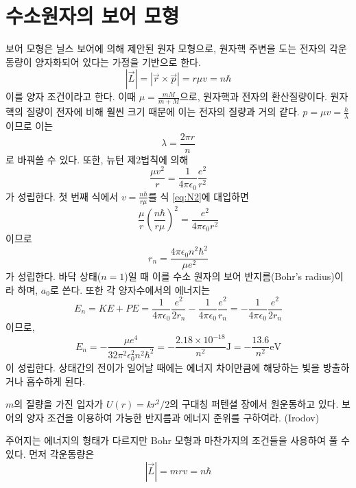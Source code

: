 \section{수소원자의 보어 모형}
보어 모형은 닐스 보어에 의해 제안된 원자 모형으로, 원자핵 주변을 도는 전자의 각운동량이 양자화되어 있다는 가정을 기반으로 한다. 
\begin{equation}
|\vec{L}|=|\vec{r}\times \vec{p}|=r\mu v=n\hbar
\end{equation}
이를 양자 조건이라고 한다. 이때 $\mu=\frac{mM}{m+M}$으로, 원자핵과 전자의 환산질량이다. 원자핵의 질량이 전자에 비해 훨씬 크기 때문에 이는 전자의 질량과 거의 같다. $p=\mu v=\frac{h}{\lambda}$이므로 이는
\begin{equation}
\lambda = \frac{2\pi r}{n}
\end{equation}
로 바꿔쓸 수 있다. 또한, 뉴턴 제2법칙에 의해
\begin{equation}\label{eq:N2}
\frac{\mu v^2}{r}=\frac{1}{4\pi \epsilon_0}\frac{e^2}{r^2}
\end{equation}
가 성립한다. 첫 번째 식에서 $v=\frac{n\hbar}{r\mu}$를 식 \ref{eq:N2}에 대입하면 
\begin{equation}
\frac{\mu}{r}\left(\frac{n\hbar}{r\mu}\right)^2=\frac{e^2}{4\pi\epsilon_0r^2}
\end{equation}
이므로
\begin{equation}
r_n=\frac{4\pi \epsilon_0 n^2\hbar^2}{\mu e^2}
\end{equation}
가 성립한다. 바닥 상태($n=1$)일 때 이를 수소 원자의 보어 반지름(Bohr's radius)이라 하며, $a_0$로 쓴다. 또한 각 양자수에서의 에너지는 
\begin{equation}
E_n=KE+PE=\frac{1}{4\pi \epsilon_0}\frac{e^2}{2r_n}-\frac{1}{4\pi \epsilon_0}\frac{e^2}{r_n}=-\frac{1}{4\pi \epsilon_0}\frac{e^2}{2r_n}
\end{equation}
이므로,
\begin{equation}
E_n=-\frac{\mu e^4}{32\pi^2\epsilon_0^2n^2\hbar^2}= -\frac{2.18\times 10^{-18}}{n^2}\mathrm{J}=-\frac{13.6}{n^2}\mathrm{eV}
\end{equation}
이 성립한다. 상태간의 전이가 일어날 때에는 에너지 차이만큼에 해당하는 빛을 방출하거나 흡수하게 된다.
\begin{example}
$m$의 질량을 가진 입자가 $U(r)=kr^2/2$의 구대칭 퍼텐셜 장에서 원운동하고 있다. 보어의 양자 조건을 이용하여 가능한 반지름과 에너지 준위를 구하여라. (Irodov)
\end{example}
주어지는 에너지의 형태가 다르지만 Bohr 모형과 마찬가지의 조건들을 사용하여 풀 수 있다. 먼저 각운동량은
\begin{equation}
|\vec{L}|=mrv=n\hbar
\end{equation}
